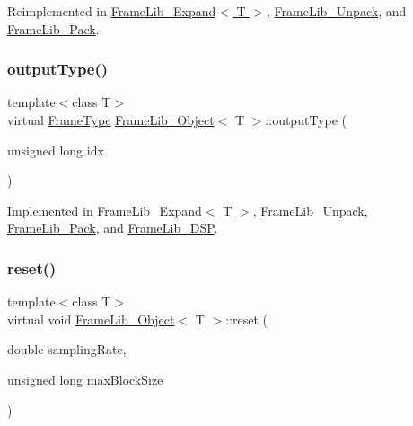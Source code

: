 Reimplemented in \hyperlink{class_frame_lib___expand_abba12bed97c0b76095f1e1a699591b3e}{Frame\+Lib\+\_\+\+Expand$<$ T $>$}, \hyperlink{class_frame_lib___unpack_a7e9a710850c3d94d73d00ea27a90d494}{Frame\+Lib\+\_\+\+Unpack}, and \hyperlink{class_frame_lib___pack_a40e71debefbc3e5e507e4f494e9efd68}{Frame\+Lib\+\_\+\+Pack}.

\mbox{\label{class_frame_lib___object_abdfca6b259f5fc7f97f4f2e016c1d80f}} 
\subsubsection{\texorpdfstring{output\+Type()}{outputType()}}
{\footnotesize\ttfamily template$<$class T$>$ \\
virtual \hyperlink{_frame_lib___types_8h_ad495a9f61af7fff07d7e97979d1ab854}{Frame\+Type} \hyperlink{class_frame_lib___object}{Frame\+Lib\+\_\+\+Object}$<$ T $>$\+::output\+Type (\begin{DoxyParamCaption}\item[{unsigned long}]{idx }\end{DoxyParamCaption})\hspace{0.3cm}{\ttfamily [pure virtual]}}



Implemented in \hyperlink{class_frame_lib___expand_a926ee7c8b222e018cae92ffbdecb1270}{Frame\+Lib\+\_\+\+Expand$<$ T $>$}, \hyperlink{class_frame_lib___unpack_a7a88aeaeeaa657858c014a685ef901e7}{Frame\+Lib\+\_\+\+Unpack}, \hyperlink{class_frame_lib___pack_a59f695dc513fda6afa6bc0948c002533}{Frame\+Lib\+\_\+\+Pack}, and \hyperlink{class_frame_lib___d_s_p_aaffa4da5531641a7da9f85e93d3440f0}{Frame\+Lib\+\_\+\+D\+SP}.

\mbox{\label{class_frame_lib___object_aeb02311ab422dd569aeb982e31a66893}} 
\subsubsection{\texorpdfstring{reset()}{reset()}}
{\footnotesize\ttfamily template$<$class T$>$ \\
virtual void \hyperlink{class_frame_lib___object}{Frame\+Lib\+\_\+\+Object}$<$ T $>$\+::reset (\begin{DoxyParamCaption}\item[{double}]{sampling\+Rate,  }\item[{unsigned long}]{max\+Block\+Size }\end{DoxyParamCaption})\hspace{0.3cm}{\ttfamily [pure virtual]}}



